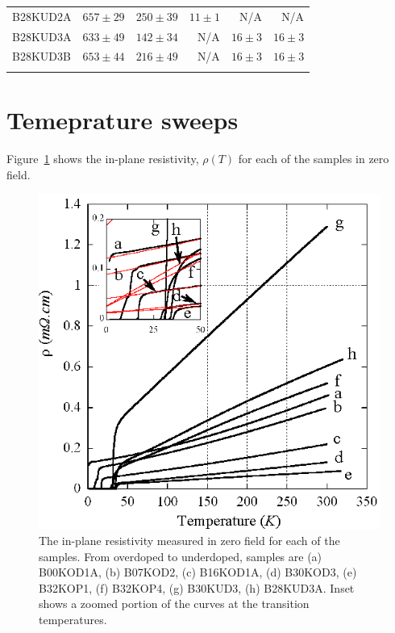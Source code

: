\begin{table}
\begin{center}
\begin{tabular}[htbp]{lrrrrr}
B28KUD2A	& $657\pm29$	& $250\pm39$	& $11\pm1$ 	& N/A		& N/A		\\
\cellcolor[gray]{0.9}B28KUD3A	& \cellcolor[gray]{0.9}$633\pm49$	& \cellcolor[gray]{0.9}$142\pm34$	& \cellcolor[gray]{0.9}N/A		& \cellcolor[gray]{0.9}$16\pm3$	& \cellcolor[gray]{0.9}$16\pm3$	\\
B28KUD3B	& $653\pm44$	& $216\pm49$	& N/A		& $16\pm3$	& $16\pm3$	\\
\bottomrule
        \label{Table:ExpH:Thicknesses}
        \end{tabular}
    \end{center}
\end{table}

\section{Temeprature sweeps}

Figure~\ref{Fig:ExpH:TSweeps} shows the in-plane resistivity, $\rho(T)$ for each of the samples in zero field.
\begin{figure}[htbp]
	\begin{center}
		\includegraphics[scale=0.9]{Chapter-HallBSCO/Figures/TSweeps/TSweeps}
		\caption{The in-plane resistivity measured in zero field for each of the samples. From overdoped to underdoped, samples are (a) B00KOD1A, (b) B07KOD2, (c) B16KOD1A, (d) B30KOD3, (e) B32KOP1, (f) B32KOP4, (g) B30KUD3, (h) B28KUD3A. Inset shows a zoomed portion of the curves at the transition temperatures.}
		\label{Fig:ExpH:TSweeps}
	\end{center}
\end{figure}

